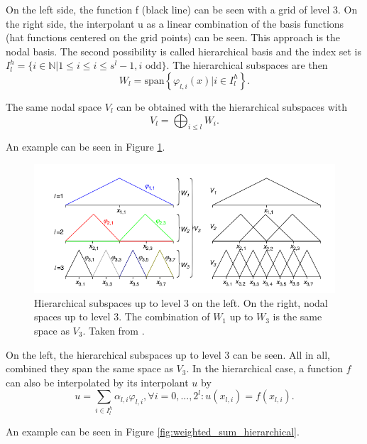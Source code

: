 On the left side, the function f (black line) can be seen with a grid of level 3. On the right side, the interpolant u as a linear combination of the basis functions (hat functions centered on the grid points) can be seen. This approach is the nodal basis. The second possibility is called hierarchical basis and the index set is $I_l^h = \{i \in \mathbb{N} | 1 \le i \le i \le s^l-1, i \text{ odd}\}$. The hierarchical subspaces are then 
\begin{equation}
	W_l = \text{span}\left\{ \varphi_{l,i}(x) | i \in I_l^h\right\}.
\end{equation}

The same nodal space $ V_l $ can be obtained with the hierarchical subspaces with 
\begin{equation}
	V_l = \bigoplus_{i \le l} W_i.
\end{equation}

An example can be seen in Figure \ref{fig:hierarchical_basis}.
\begin{figure}[H]
	\centering
	\includegraphics[scale=0.5]{figures/hierarchical_basis.png}
	\caption{ Hierarchical subspaces up to level 3 on the left. On the right, nodal spaces up to level 3. The combination of $ W_1 $ up to $ W_3 $ is the same space as $ V_3 $. Taken from \cite{pfluger2010spatially}. }
	\label{fig:hierarchical_basis}
\end{figure}

On the left, the hierarchical subspaces up to level 3 can be seen. All in all, combined they span the same space as $ V_3 $. In the hierarchical case, a function $ f $ can also be interpolated by its interpolant $ u $ by 
\begin{equation}
	u = \sum_{i \in I_l^h}\alpha_{l,i} \varphi_{l,i}, \forall i = 0,...,2^l: u(x_{l,i}) = f(x_{l,i}).
\end{equation}

An example can be seen in Figure \ref{fig:weighted_sum_hierarchical}.

